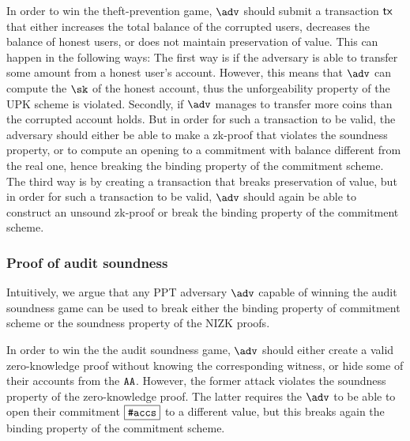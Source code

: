 In order to win the theft-prevention game, $\adv$ should submit a transaction $\txn$ that either increases the total balance of the corrupted users, decreases the balance of honest users, or does not maintain preservation of value.
This can happen in the following ways:
The first way is if the adversary is able to transfer some amount from a honest user's account. However, this means that $\adv$ can compute the $\sk$ of the honest account, thus the unforgeability property of the UPK scheme is violated. 
Secondly,  if $\adv$ manages to transfer more coins than the corrupted account holds. But in order for such a transaction to be valid, the adversary should either be able to make a zk-proof that violates the soundness property, or to compute an opening to a commitment with balance different from the real one, hence breaking the binding property of the commitment scheme. 
The third way is by creating a transaction that breaks preservation of value, but in order for such a transaction to be valid, $\adv$ should again be able to construct an unsound zk-proof or break the binding property of the commitment scheme.



\subsubsection{Proof of audit soundness}
Intuitively, we argue that any PPT adversary $\adv$ capable of winning the audit soundness game can be used to break either the binding property of commitment scheme or the soundness property of the NIZK proofs. 

In order to win the the audit soundness game, $\adv$ should either create a valid zero-knowledge proof without knowing the corresponding witness, or hide some of their accounts from the $\AA$. However, the former attack violates the soundness property of the zero-knowledge proof. The latter requires the $\adv$ to be able to open their commitment $\comm{\numaccs}$ to a different value, but this breaks again the binding property of the commitment scheme.


